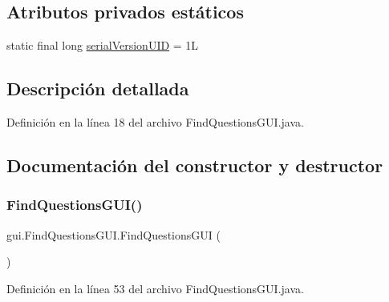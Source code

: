\subsection*{Atributos privados estáticos}
\begin{DoxyCompactItemize}
\item 
static final long \mbox{\hyperlink{classgui_1_1FindQuestionsGUI_ae92822eeba6f2ba8dcae73d5ad17325c}{serial\+Version\+U\+ID}} = 1L
\end{DoxyCompactItemize}


\subsection{Descripción detallada}


Definición en la línea 18 del archivo Find\+Questions\+G\+U\+I.\+java.



\subsection{Documentación del constructor y destructor}
\mbox{\label{classgui_1_1FindQuestionsGUI_ab650ec475d8d7e0861cb35ebc66b86b5}} 
\subsubsection{\texorpdfstring{FindQuestionsGUI()}{FindQuestionsGUI()}}
{\footnotesize\ttfamily gui.\+Find\+Questions\+G\+U\+I.\+Find\+Questions\+G\+UI (\begin{DoxyParamCaption}{ }\end{DoxyParamCaption})}



Definición en la línea 53 del archivo Find\+Questions\+G\+U\+I.\+java.


\begin{DoxyCode}{0}

\end{DoxyCode}


